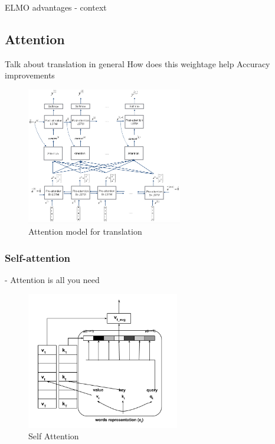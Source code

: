 \documentclass[a4paper, 11pt]{article}
\begin{document}
ELMO advantages - context

\subsection{Attention}

Talk about translation in general
How does this weightage help
Accuracy improvements
\parencite{bahdanau2014neural}

\begin{figure}[H]
    \centering
    \includegraphics[width=\textwidth,height=6cm,keepaspectratio=true]
    {attention-model-1.png}
    \caption{
        Attention model for translation
    }
    \label{fig:attention_model}
\end{figure}

\subsubsection{Self-attention}

\parencite{Vaswani2017} - Attention is all you need

\begin{figure}[H]
    \centering
    \includegraphics[width=\textwidth,height=6cm,keepaspectratio=true]
    {self-attention.png}
    \caption{
        Self Attention
    }
    \label{fig:Self attention head}
\end{figure}
\end{document}
